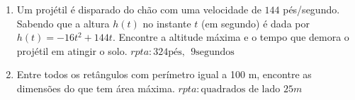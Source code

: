 \documentclass[11pt]{article}
\begin{document}
\begin{enumerate}
     \item Um projétil é disparado do chão com uma velocidade de $144$ pés/segundo. Sabendo que a altura $h(t)$ no 
     instante $t$ (em segundo) é 
     dada por $h(t)=-16t^{2}+144t$.
     Encontre a altitude máxima e o tempo que demora o projétil em atingir o solo.     
       \hfill $rpta: 324 \text{pés}, \ \ 9 \text{segundos}$                                                                     
    \item Entre todos os retângulos com perímetro igual a 100 m, encontre as dimensões do que tem área máxima. 
          \hfill $rpta: \text{quadrados de lado } 25m$                                                                    
    \end{enumerate}            
\end{document}
